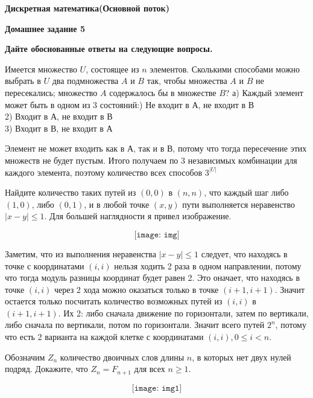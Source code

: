 \documentclass[11pt]{article}
\def\week{5}
\def\theproblem{К\week.\arabic{problem}}
\begin{document}
\setcounter{problem}{0}
\def\theproblem{Д\week.\arabic{problem}}
{\textbf{\large Дискретная математика}\hfill \textbf{(Основной поток)}

\medskip %

\textbf{Домашнее задание \week}}

\medskip

\textbf{Дайте обоснованные ответы на следующие вопросы.}


\vspace{5mm}

\p Имеется множество $U$, состоящее из $n$ элементов. Сколькими способами можно выбрать в $U$ два подмножества $A$ и $B$ так, чтобы
\sp множества $A$ и $B$ не пересекались;
\sp множество $A$ содержалось бы в множестве $B$?
\sspace
а) Каждый элемент может быть в одном из 3 состояний:) Не входит в А, не входит в В\\
2) Входит в А, не входит в В\\
3) Входит в В, не входит в А \sspace

Элемент не может входить как в А, так и в В, потому что тогда пересечение этих множеств не будет пустым. Итого получаем по 3 независимых комбинации для каждого элемента, поэтому количество всех способов $3^{|U|}$
\sspace
{}
\sspace

\p Найдите количество таких путей из $(0,0)$ в $(n,n)$, что каждый шаг  либо $(1,0)$, либо $(0,1)$,  и в любой точке $(x,y)$ пути выполняется неравенство $|x-y|\leq1$.
\sspace
Для большей наглядности я привел изображение. 

\[\texttt{[image: img]}\]

Заметим, что из выполнения неравенства $|x-y|\leq1$ следует, что находясь в точке с координатами $(i, i)$ нельзя ходить 2 раза в одном направлении, потому что тогда модуль разницы координат будет равен 2. Это оначает, что находясь в точке $(i, i)$ через 2 хода можно оказаться только в точке $(i + 1, i + 1)$. Значит остается только посчитать количество возможных путей из $(i, i)$ в $(i + 1, i + 1)$. Их 2: либо сначала движение по горизонтали, затем по вертикали, либо сначала по вертикали, потом по горизонтали. Значит всего путей $2^n$, потому что есть 2 варианта на каждой клетке с координатами $(i,i), 0 \leq i < n$.
\sspace
{}
\sspace

\p Обозначим $Z_n$ количество двоичных слов длины $n$, в которых нет двух нулей подряд. Докажите, что $Z_n = F_{n+1}$ для всех $n\geq1$. \sspace

\[\texttt{[image: img1]}\]
\end{document}
